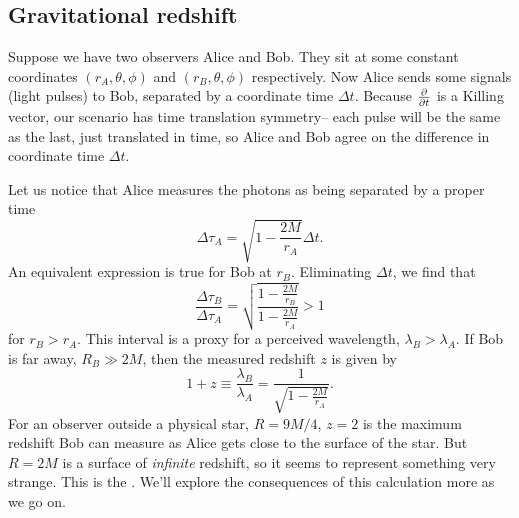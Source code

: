 \subsection*{Gravitational redshift} Suppose we have two observers Alice and Bob. They sit at some constant coordinates $(r_A,\theta,\phi)$ and $(r_B,\theta,\phi)$ respectively. Now Alice sends some signals (light pulses) to Bob, separated by a coordinate time $\Delta t$. Because $\P{}{t}$ is a Killing vector, our scenario has time translation symmetry-- each pulse will be the same as the last, just translated in time, so Alice and Bob agree on the difference in coordinate time $\Delta t$.

Let us notice that Alice measures the photons as being separated by a proper time
\begin{equation}
    \Delta \tau_{A}=\sqrt{1-\frac{2M}{r_A}}\Delta t.
\end{equation}
An equivalent expression is true for Bob at $r_B$. Eliminating $\Delta t$, we find that
\begin{equation}
    \frac{\Delta \tau_B}{\Delta \tau_A}=\sqrt{\frac{1-\frac{2M}{r_B}}{1-\frac{2M}{r_A}}} >1
\end{equation}
for $r_B > r_A$. This interval is a proxy for a perceived wavelength, $\lambda_B > \lambda_A$. If Bob is far away, $R_B \gg 2M$, then the measured redshift $z$ is given by
\begin{equation}
    1+z \equiv \frac{\lambda_B}{\lambda_A}= \frac{1}{\sqrt{1-\frac{2M}{r_A}}}.
\end{equation}
For an observer outside a physical star, $R=9M/4$, $z=2$ is the maximum redshift Bob can measure as Alice gets close to the surface of the star. But $R=2M$ is a surface of \emph{infinite} redshift, so it seems to represent something very strange. This is the . We'll explore the consequences of this calculation more as we go on.

